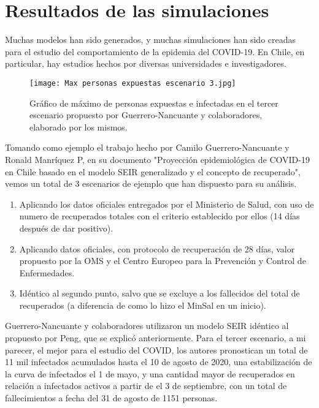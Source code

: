 \section{Resultados de las simulaciones}
Muchas modelos han sido generados, y muchas simulaciones han sido creadas para el estudio del comportamiento de la epidemia del COVID-19. En Chile, en particular, hay estudios hechos por diversas universidades e investigadores.

\begin{figure}
    \texttt{[image: Max personas expuestas escenario 3.jpg]}
    \caption{Gráfico de máximo de personas expuestas e infectadas en el tercer escenario propuesto por Guerrero-Nancuante y colaboradores, elaborado por los mismos.}
    \label{grafico escenario 3}
\end{figure}

Tomando como ejemplo el trabajo hecho por Camilo Guerrero-Nancuante y Ronald Manríquez P, en su documento "Proyección epidemiológica de COVID-19 en Chile basado en el modelo SEIR generalizado y el concepto de recuperado"\cite{guerrero-nancuante_manriquezp_2020}, vemos un total de 3 escenarios de ejemplo que han dispuesto para su análisis.

\begin{enumerate}
    \item Aplicando los datos oficiales entregados por el Ministerio de Salud, con uso de numero de recuperados totales con el criterio establecido por ellos (14 días después de dar positivo).
    \item Aplicando datos oficiales, con protocolo de recuperación de 28 días, valor propuesto por la OMS y el Centro Europeo para la Prevención y Control de Enfermedades.
    \item Idéntico al segundo punto, salvo que se excluye a los fallecidos del total de recuperados (a diferencia de como lo hizo el MinSal en un inicio).
\end{enumerate}

Guerrero-Nancuante y colaboradores utilizaron un modelo SEIR idéntico al propuesto por Peng, que se explicó anteriormente. Para el tercer escenario, a mi parecer, el mejor para el estudio del COVID, los autores pronostican un total de 11 mil infectados acumulados hasta el 10 de agosto de 2020, una estabilización de la curva de infectados el 1 de mayo, y una cantidad mayor de recuperados en relación a infectados activos a partir de el 3 de septiembre, con un total de fallecimientos a fecha del 31 de agosto de 1151 personas.

